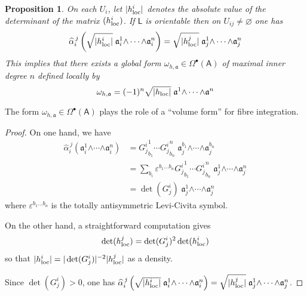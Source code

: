 \documentclass[number]{elsarticle}
\newtheorem{proposition}[theorem]{Proposition}
\theoremstyle{definition}
\theoremstyle{remark}
\numberwithin{equation}{section}
\begin{document}
\begin{proposition}
\label{prop-globalinnerform}
On each $U_i$, let $|h^i_{{\text{\textup{loc}}}}|$ denotes the absolute value of the determinant of the matrix $(h^i_{{\text{\textup{loc}}}})$. If ${{{{\mathbf{\mathsf{{L}}}}}}}$ is orientable then on $U_{ij}\neq {{\varnothing}}$ one has
\begin{equation*}
{\widehat{\alpha}}_{i}^{\,j}\left( \sqrt{|h^i_{{\text{\textup{loc}}}}|}\; {\mathfrak{a}}_i^{1} {\mathord{\wedge}} \cdots {\mathord{\wedge}} {\mathfrak{a}}_i^{n}\right) = \sqrt{|h^j_{{\text{\textup{loc}}}}|}\; {\mathfrak{a}}_j^{1} {\mathord{\wedge}} \cdots {\mathord{\wedge}} {\mathfrak{a}}_j^{n}
\end{equation*}
This implies that there exists a global form $\omega_{h,{\mathfrak{a}}} \in \Omega^{\bullet}({{{{\mathbf{\mathsf{{A}}}}}}})$ of maximal inner degree $n$ defined locally by
\begin{equation*}
\omega_{h,{\mathfrak{a}}} = (-1)^n \sqrt{|h_{{\text{\textup{loc}}}}|}\; {\mathfrak{a}}^{1} {\mathord{\wedge}} \cdots {\mathord{\wedge}} {\mathfrak{a}}^{n}
\end{equation*}
\end{proposition}

The form $\omega_{h,{\mathfrak{a}}} \in \Omega^{\bullet}({{{{\mathbf{\mathsf{{A}}}}}}})$ plays the role of a ``volume form'' for fibre integration.

\begin{proof}
On one hand, we have
\begin{align*}
{\widehat{\alpha}}_{i}^{\,j}\left( {\mathfrak{a}}_i^{1} {\mathord{\wedge}} \cdots {\mathord{\wedge}} {\mathfrak{a}}_i^{n} \right) 
&= {G^{i}_{j}}^1_{b_1} \cdots {G^{i}_{j}}^n_{b_n}\; {\mathfrak{a}}_j^{b_1} {\mathord{\wedge}} \cdots {\mathord{\wedge}} {\mathfrak{a}}_j^{b_n}
\\
&= \sum_{b_i} \varepsilon^{b_1 \dots b_n} {G^{i}_{j}}^1_{b_1} \cdots {G^{i}_{j}}^n_{b_n}\; {\mathfrak{a}}_j^{1} {\mathord{\wedge}} \cdots {\mathord{\wedge}} {\mathfrak{a}}_j^{n}
\\
&= \det({G^{i}_{j}})\; {\mathfrak{a}}_j^{1} {\mathord{\wedge}} \cdots {\mathord{\wedge}} {\mathfrak{a}}_j^{n}
\end{align*}
where $\varepsilon^{b_1 \dots b_n}$ is the totally antisymmetric Levi-Civita symbol. 

On the other hand, a straightforward computation gives 
\begin{equation}
\det(h^j_{{\text{\textup{loc}}}}) = \det({G^{i}_{j}})^2 \det(h^i_{{\text{\textup{loc}}}}) \label{eq-relationtrivdeth}
\end{equation}
so that $|h^i_{{\text{\textup{loc}}}}| = |\det({G^{i}_{j}})|^{-2} |h^j_{{\text{\textup{loc}}}}|$ as a density.

Since $\det({G^{i}_{j}}) > 0$, one has ${\widehat{\alpha}}_{i}^{\,j}\left( \sqrt{|h^i_{{\text{\textup{loc}}}}|}\; {\mathfrak{a}}_i^{1} {\mathord{\wedge}} \cdots {\mathord{\wedge}} {\mathfrak{a}}_i^{n} \right) = \sqrt{|h^j_{{\text{\textup{loc}}}}|}\; {\mathfrak{a}}_j^{1} {\mathord{\wedge}} \cdots {\mathord{\wedge}} {\mathfrak{a}}_j^{n}$.
\end{proof}
\end{document}
